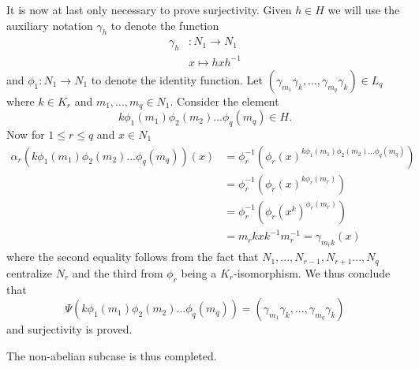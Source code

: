 It is now at last only necessary to prove surjectivity. Given $h \in H$ we will use the auxiliary notation $\gamma_h$ to denote the function
\begin{align*}
    \gamma_h &\colon N_1 \rightarrow N_1 \\
             &x \mapsto hxh^{-1}
\end{align*}
and $\phi_1 \colon N_1 \rightarrow N_1$ to denote the identity function.
Let $(\gamma_{m_1}\gamma_k,...,\gamma_{m_q}\gamma_k) \in L_q$ where $k \in K_r$ and $m_1,...,m_q \in N_1$. 
Consider the element $$k\phi_1(m_1)\phi_2(m_2)...\phi_q(m_q) \in H.$$ 
Now for $1 \le r \le q$ and $x \in N_1$
\begin{align*}
    \alpha_r(k\phi_1(m_1)\phi_2(m_2)...\phi_q(m_q))(x) &= \phi_r^{-1}(\phi_r(x)^{k\phi_1(m_1)\phi_2(m_2)...\phi_q(m_q)}) \\
    &= \phi_r^{-1}(\phi_r(x)^{k\phi_r(m_r)}) \\
    &= \phi_r^{-1}(\phi_r(x^k)^{\phi_r(m_r)}) \\
    &= m_rkxk^{-1}m_r^{-1} = \gamma_{m_rk}(x)
\end{align*}
where the second equality follows from the fact that $N_1,...,N_{r-1},N_{r+1}...,N_q$ centralize $N_r$ and the third from $\phi_r$ being a $K_r$-isomorphism. We thus conclude that
$$
\Psi(k\phi_1(m_1)\phi_2(m_2)...\phi_q(m_q)) = (\gamma_{m_1}\gamma_k,...,\gamma_{m_q}\gamma_k)
$$
and surjectivity is proved.

The non-abelian subcase is thus completed.
